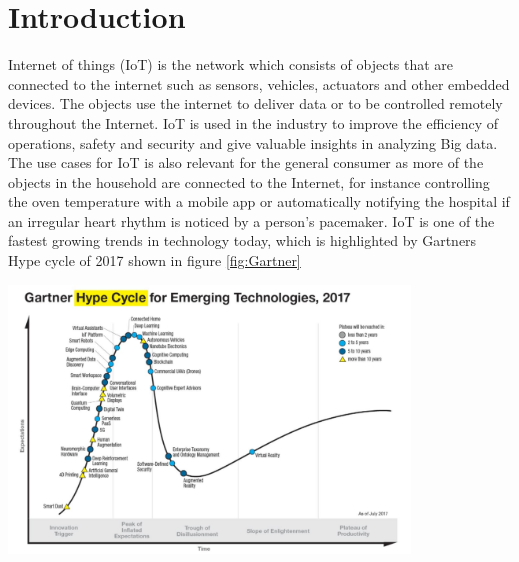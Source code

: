 
\chapter{Introduction}



Internet of things (IoT) is the network which consists of objects that are connected to the internet such as sensors, vehicles, actuators and other embedded devices. The objects use the internet to deliver data or to be controlled remotely throughout the Internet. IoT is used in the industry to improve the efficiency of operations, safety and security and give valuable insights in analyzing Big data. The use cases for IoT is also relevant for the general consumer as more of the objects in the household are connected to the Internet, for instance controlling the oven temperature with a mobile app or automatically notifying the hospital if an irregular heart rhythm is noticed by a person's pacemaker. IoT is one of the fastest growing trends in technology today, which is highlighted by Gartners Hype cycle of 2017 shown in figure \ref{fig:Gartner}\\


\begin{minipage}[t]{0.8\textwidth}
    \centering
    \includegraphics[width=0.8\textwidth]{Images/Gartner.PNG}\\
    \label{fig:Gartner}
\end{minipage}
\\




